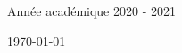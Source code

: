 \documentclass[ 
11pt, %
french, %
singlespacing, %
parskip, %
headsepline, %
openany, %
]{MastersDoctoralThesis} %
\theoremstyle{plain}
\numberwithin{theorem}{section}  %
\begin{document}
\begin{titlepage}
\begin{center}
\vspace*{.04\textheight}
\large Année académique 2020 - 2021

\vfill

{\large \today}\\[4cm] %

\end{center}
\end{titlepage}

%
%
%
%
%

%
%
%
\end{document}
